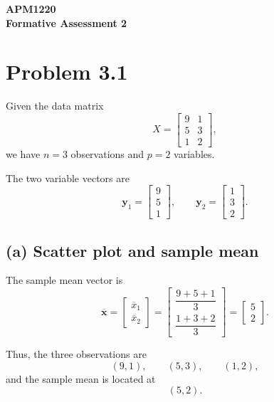 \documentclass[12pt,a4paper]{article}
\begin{document}
\begin{titlepage}
    \centering
    \vspace*{1.5cm}

    {\Large\textbf{APM1220}}\\[0.5cm]
    {\LARGE\textbf{Formative Assessment 2}}\\[1cm]

\end{titlepage}
\newpage

\section{Problem 3.1}

Given the data matrix
\[
X=
\begin{bmatrix}
9&1\\
5&3\\
1&2
\end{bmatrix},
\]
we have \(n=3\) observations and \(p=2\) variables.

The two variable vectors are
\[
\mathbf{y}_1=
\begin{bmatrix}
9\\5\\1
\end{bmatrix},
\qquad
\mathbf{y}_2=
\begin{bmatrix}
1\\3\\2
\end{bmatrix}.
\]

\subsection*{(a) Scatter plot and sample mean}

The sample mean vector is
\[
\overline{\mathbf{x}}
=
\begin{bmatrix}
\overline{x}_1\\
\overline{x}_2
\end{bmatrix}
=
\begin{bmatrix}
\dfrac{9+5+1}{3}\\[6pt]
\dfrac{1+3+2}{3}
\end{bmatrix}
=
\begin{bmatrix}
5\\
2
\end{bmatrix}.
\]

Thus, the three observations are
\[
(9,1),\qquad (5,3),\qquad (1,2),
\]
and the sample mean is located at
\[
\boxed{(5,2)}.
\]
\end{document}
